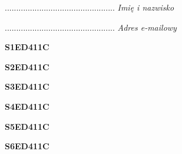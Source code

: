 \begin{turn}{90}\begin{minipage}{\linewidth} \vspace{20mm} ................................................  \textit{Imię i nazwisko}\end{minipage}\end{turn}

\begin{turn}{90}\begin{minipage}{\linewidth} \vspace{20mm} ................................................  \textit{Adres e-mailowy}\end{minipage}\end{turn}

\begin{turn}{90}\huge \begin{minipage}{\linewidth} \vspace{10mm}\textbf{S1ED411C}\end{minipage}\end{turn}

\begin{turn}{90}\huge \begin{minipage}{\linewidth} \vspace{10mm}\textbf{S2ED411C}\end{minipage}\end{turn}

\begin{turn}{90}\huge \begin{minipage}{\linewidth} \vspace{10mm}\textbf{S3ED411C}\end{minipage}\end{turn}

\begin{turn}{90}\huge \begin{minipage}{\linewidth} \vspace{10mm}\textbf{S4ED411C}\end{minipage}\end{turn}

\begin{turn}{90}\huge \begin{minipage}{\linewidth} \vspace{10mm}\textbf{S5ED411C}\end{minipage}\end{turn}

\begin{turn}{90}\huge \begin{minipage}{\linewidth} \vspace{10mm}\textbf{S6ED411C}\end{minipage}\end{turn}

